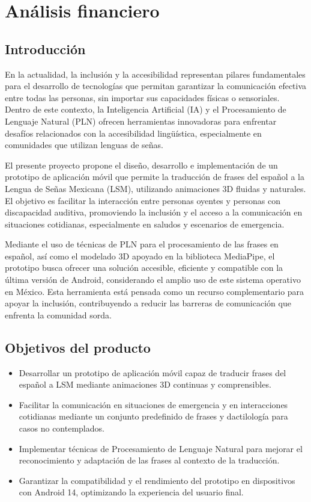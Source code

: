 \chapter{Análisis financiero}
\section{Introducción}
En la actualidad, la inclusión y la accesibilidad representan pilares fundamentales para el desarrollo de tecnologías que permitan garantizar la comunicación efectiva entre todas las personas, sin importar sus capacidades físicas o sensoriales. Dentro de este contexto, la Inteligencia Artificial (IA) y el Procesamiento de Lenguaje Natural (PLN) ofrecen herramientas innovadoras para enfrentar desafíos relacionados con la accesibilidad lingüística, especialmente en comunidades que utilizan lenguas de señas.

El presente proyecto propone el diseño, desarrollo e implementación de un prototipo de aplicación móvil que permite la traducción de frases del español a la Lengua de Señas Mexicana (LSM), utilizando animaciones 3D fluidas y naturales. El objetivo es facilitar la interacción entre personas oyentes y personas con discapacidad auditiva, promoviendo la inclusión y el acceso a la comunicación en situaciones cotidianas, especialmente en saludos y escenarios de emergencia.

Mediante el uso de técnicas de PLN para el procesamiento de las frases en español, así como el modelado 3D apoyado en la biblioteca MediaPipe, el prototipo busca ofrecer una solución accesible, eficiente y compatible con la última versión de Android, considerando el amplio uso de este sistema operativo en México. Esta herramienta está pensada como un recurso complementario para apoyar la inclusión, contribuyendo a reducir las barreras de comunicación que enfrenta la comunidad sorda.

\section{Objetivos del producto}
\begin{itemize}
	\item Desarrollar un prototipo de aplicación móvil capaz de traducir frases del español a LSM mediante animaciones 3D continuas y comprensibles.
	\item Facilitar la comunicación en situaciones de emergencia y en interacciones cotidianas mediante un conjunto predefinido de frases y dactilología para casos no contemplados.
	\item Implementar técnicas de Procesamiento de Lenguaje Natural para mejorar el reconocimiento y adaptación de las frases al contexto de la traducción.
	\item Garantizar la compatibilidad y el rendimiento del prototipo en dispositivos con Android 14, optimizando la experiencia del usuario final.
\end{itemize}

